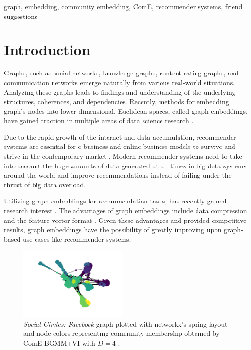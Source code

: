 \documentclass[conference]{IEEEtran}
\begin{document}
\begin{IEEEkeywords}
    graph, embedding, community embedding, ComE, recommender systems, friend suggestions
\end{IEEEkeywords}


\section{Introduction}

Graphs, such as social networks, knowledge graphs, content-rating graphs, and communication networks emerge naturally from various real-world situations. Analyzing these graphs leads to findings and understanding of the underlying structures, coherences, and dependencies. Recently, methods for embedding graph's nodes into lower-dimensional, Euclidean spaces, called graph embeddings, have gained traction in multiple areas of data science research \cite{Goyal_2018}.

Due to the rapid growth of the internet and data accumulation, recommender systems are essential for e-business and online business models to survive and strive in the contemporary market \cite{Polatidis2013RecommenderST}. Modern recommender systems need to take into account the huge amounts of data generated at all times in big data systems around the world and improve recommendations instead of failing under the thrust of big data overload.

Utilizing graph embeddings for recommendation tasks, has recently gained research interest \cite{Palumbo2018AnEC, Palumbo2018KnowledgeGE, GradGyenge2017GraphEB, Sathish2019GraphEB}. The advantages of graph embeddings include data compression and the feature vector format \cite{Godec2018}. Given these advantages and provided competitive results, graph embeddings have the possibility of greatly improving upon graph-based use-cases like recommender systems.

\begin{figure}[htbp]
    \centering
    \includegraphics[width=0.48\textwidth]{images/fb/graph_d4.png}
    \caption{\textit{Social Circles: Facebook} graph plotted with networkx's spring layout and node colors representing community membership obtained by ComE BGMM+VI with $D=4$ \cite{networkx}.}
    \label{fig:fb_graph}
\end{figure}
\end{document}
